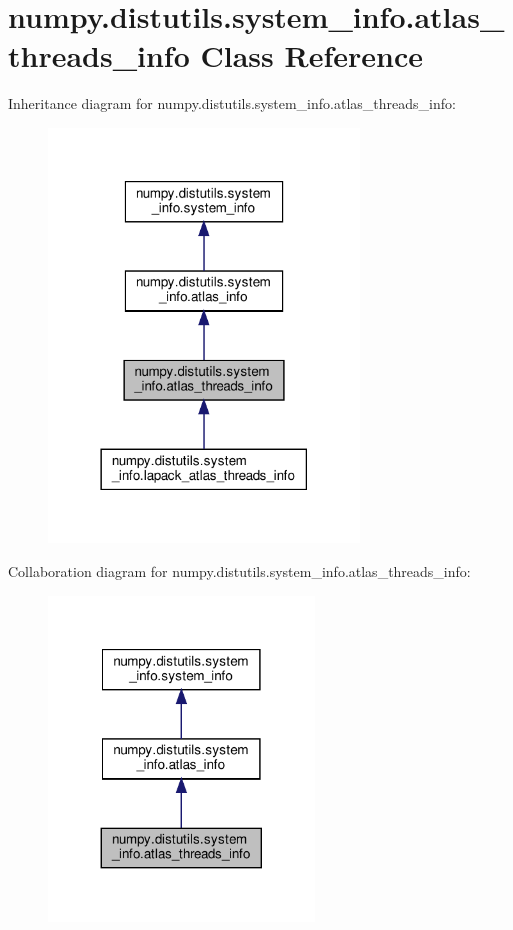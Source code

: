 \hypertarget{classnumpy_1_1distutils_1_1system__info_1_1atlas__threads__info}{}\section{numpy.\+distutils.\+system\+\_\+info.\+atlas\+\_\+threads\+\_\+info Class Reference}
\label{classnumpy_1_1distutils_1_1system__info_1_1atlas__threads__info}


Inheritance diagram for numpy.\+distutils.\+system\+\_\+info.\+atlas\+\_\+threads\+\_\+info\+:
\nopagebreak
\begin{figure}[H]
\begin{center}
\leavevmode
\includegraphics[width=234pt]{classnumpy_1_1distutils_1_1system__info_1_1atlas__threads__info__inherit__graph}
\end{center}
\end{figure}


Collaboration diagram for numpy.\+distutils.\+system\+\_\+info.\+atlas\+\_\+threads\+\_\+info\+:
\nopagebreak
\begin{figure}[H]
\begin{center}
\leavevmode
\includegraphics[width=200pt]{classnumpy_1_1distutils_1_1system__info_1_1atlas__threads__info__coll__graph}
\end{center}
\end{figure}
